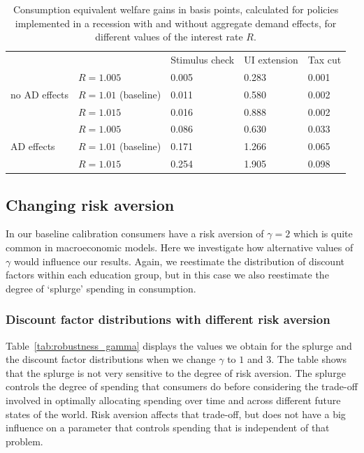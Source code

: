 \documentclass[../HAFiscal]{subfiles}
\begin{document}
\begin{table}[]
	\begin{center}
		\begin{tabular}{@{}lllll@{}}
			\toprule
			&                    & Stimulus check & UI extension & Tax cut \\ \cmidrule(l){1-5} 
			\multirow{3}{*}{no AD effects}            	& $R = 1.005$ 			& 0.005        & 0.283       & 0.001	\\
			& $R = 1.01$ (baseline) & 0.011        & 0.580       & 0.002   	\\
			& $R = 1.015$ 			& 0.016        & 0.888       & 0.002   	\\ \cmidrule(l){1-5}
			\multirow{3}{*}{AD effects}					& $R = 1.005$    		& 0.086        & 0.630       & 0.033  	\\		
			& $R = 1.01$ (baseline) & 0.171        & 1.266       & 0.065   	\\
			& $R = 1.015$    		& 0.254        & 1.905       & 0.098    \\ \cmidrule(l){1-5} 
		\end{tabular}
		\caption{Consumption equivalent welfare gains in basis points, calculated for policies implemented in a recession with and without aggregate demand effects, for different values of the interest rate $R$.}
		\label{tab:robustness_R_results}
	\end{center}
\end{table}


\FloatBarrier
\subsection{Changing risk aversion} 
\label{sec:robust_gamma} 

In our baseline calibration consumers have a risk aversion of $\gamma=2$ which is quite common in macroeconomic models. Here we investigate how alternative values of $\gamma$ would influence our results. Again, we reestimate the distribution of discount factors within each education group, but in this case we also reestimate the degree of `splurge' spending in consumption. 

\subsubsection{Discount factor distributions with different risk aversion}
\label{sec:robust_gamma_estim}

Table~\ref{tab:robustness_gamma} displays the values we obtain for the splurge and the discount factor distributions when we change $\gamma$ to $1$ and $3$. The table shows that the splurge is not very sensitive to the degree of risk aversion. The splurge controls the degree of spending that consumers do before considering the trade-off involved in optimally allocating spending over time and across different future states of the world. Risk aversion affects that trade-off, but does not have a big influence on a parameter that controls spending that is independent of that problem. 
\end{document}
